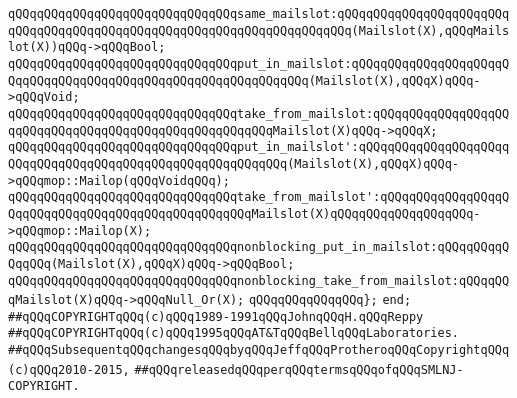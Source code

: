 \newline
\verb|qQQqqQQqqQQqqQQqqQQqqQQqqQQqqQQqsame_mailslot:qQQqqQQqqQQqqQQqqQQqqQQqqQQqqQQqqQQqqQQqqQQqqQQqqQQqqQQqqQQqqQQqqQQqqQQq(Mailslot(X),qQQqMailslot(X))qQQq->qQQqBool;|\newline
\newline
\verb|qQQqqQQqqQQqqQQqqQQqqQQqqQQqqQQqput_in_mailslot:qQQqqQQqqQQqqQQqqQQqqQQqqQQqqQQqqQQqqQQqqQQqqQQqqQQqqQQqqQQqqQQq(Mailslot(X),qQQqX)qQQq->qQQqVoid;|\newline
\verb|qQQqqQQqqQQqqQQqqQQqqQQqqQQqqQQqtake_from_mailslot:qQQqqQQqqQQqqQQqqQQqqQQqqQQqqQQqqQQqqQQqqQQqqQQqqQQqqQQqMailslot(X)qQQq->qQQqX;|\newline
\newline
\verb|qQQqqQQqqQQqqQQqqQQqqQQqqQQqqQQqput_in_mailslot':qQQqqQQqqQQqqQQqqQQqqQQqqQQqqQQqqQQqqQQqqQQqqQQqqQQqqQQqqQQq(Mailslot(X),qQQqX)qQQq->qQQqmop::Mailop(qQQqVoidqQQq);|\newline
\verb|qQQqqQQqqQQqqQQqqQQqqQQqqQQqqQQqtake_from_mailslot':qQQqqQQqqQQqqQQqqQQqqQQqqQQqqQQqqQQqqQQqqQQqqQQqqQQqMailslot(X)qQQqqQQqqQQqqQQqqQQq->qQQqmop::Mailop(X);|\newline
\newline
\verb|qQQqqQQqqQQqqQQqqQQqqQQqqQQqqQQqnonblocking_put_in_mailslot:qQQqqQQqqQQqqQQq(Mailslot(X),qQQqX)qQQq->qQQqBool;|\newline
\verb|qQQqqQQqqQQqqQQqqQQqqQQqqQQqqQQqnonblocking_take_from_mailslot:qQQqqQQqMailslot(X)qQQq->qQQqNull_Or(X);|\newline
\verb|qQQqqQQqqQQqqQQq};|\newline
\verb|end;|\newline
\newline
\newline
\verb|##qQQqCOPYRIGHTqQQq(c)qQQq1989-1991qQQqJohnqQQqH.qQQqReppy|\newline
\verb|##qQQqCOPYRIGHTqQQq(c)qQQq1995qQQqAT&TqQQqBellqQQqLaboratories.|\newline
\verb|##qQQqSubsequentqQQqchangesqQQqbyqQQqJeffqQQqProtheroqQQqCopyrightqQQq(c)qQQq2010-2015,|\newline
\verb|##qQQqreleasedqQQqperqQQqtermsqQQqofqQQqSMLNJ-COPYRIGHT.|\newline

